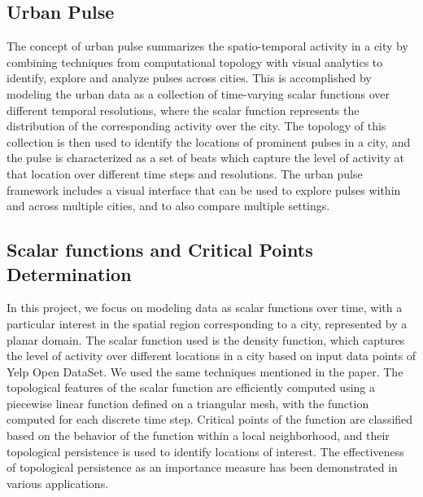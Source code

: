 \subsection{Urban Pulse}
The concept of urban pulse summarizes the spatio-temporal activity in a city by combining techniques from computational topology with visual analytics to identify, explore and analyze pulses across cities. This is accomplished by modeling the urban data as a collection of time-varying scalar functions over different temporal resolutions, where the scalar function represents the distribution of the corresponding activity over the city. The topology of this collection is then used to identify the locations of prominent pulses in a city, and the pulse is characterized as a set of beats which capture the level of activity at that location over different time steps and resolutions. The urban pulse framework includes a visual interface that can be used to explore pulses within and across multiple cities, and to also compare multiple settings.

\subsection{Scalar functions and Critical Points Determination}
In this project, we focus on modeling data as scalar functions over time, with a particular interest in the spatial region corresponding to a city, represented by a planar domain. The scalar function used is the density function, which captures the level of activity over different locations in a city based on input data points of Yelp Open DataSet. We used the same techniques mentioned in the paper\cite{b1}. The topological features of the scalar function are efficiently computed using a piecewise linear function defined on a triangular mesh, with the function computed for each discrete time step. Critical points of the function are classified based on the behavior of the function within a local neighborhood, and their topological persistence is used to identify locations of interest. The effectiveness of topological persistence as an importance measure has been demonstrated in various applications.